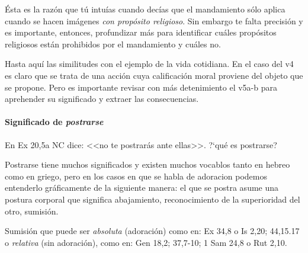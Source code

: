 \documentclass{article}
\begin{document}
\'Esta es la raz\'on que t\'u intu\'{i}as cuando dec\'{i}as que el mandamiento s\'olo aplica cuando se hacen im\'agenes \emph{con prop\'osito religioso}. Sin embargo te falta precisi\'on y es importante, entonces, profundizar m\'as para identificar cu\'ales prop\'ositos religiosos est\'an prohibidos por el mandamiento y cu\'ales no.

Hasta aqu\'{i} las similitudes con el ejemplo de la vida cotidiana. En el caso del v4 es claro que se trata de una acci\'on cuya calificaci\'on moral proviene del objeto que se propone. Pero es importante revisar con m\'as detenimiento el v5a-b para aprehender su significado y extraer las consecuencias.

\paragraph{Significado de \emph{postrarse}}

En Ex 20,5a NC dice: <<no te postrar\'as ante ellas>>. ?`qu\'e es postrarse?

Postrarse tiene muchos significados y existen muchos vocablos tanto en hebreo como en griego, pero en los casos en que se habla de adoracion podemos entenderlo gr\'aficamente de la siguiente manera: el que se postra asume una postura corporal que significa abajamiento, reconocimiento de la superioridad del otro, sumisi\'on.

Sumisi\'on que puede ser \emph{absoluta} (adoraci\'on) como en: Ex 34,8 o Is 2,20; 44,15.17 o \emph{relativa} (sin adoraci\'on), como en: Gen 18,2; 37,7-10; 1 Sam 24,8 o Rut 2,10.
\end{document}
